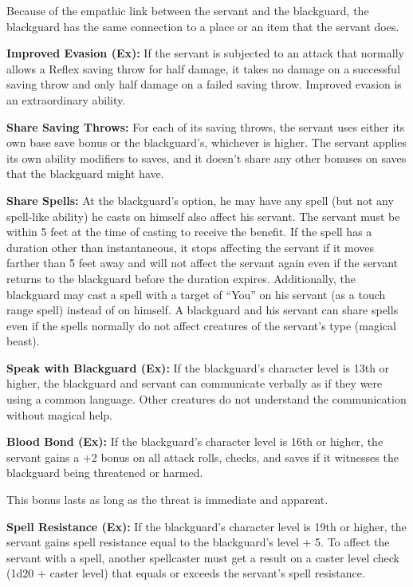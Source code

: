 \documentclass{article}
\begin{document}
Because of the empathic link between the servant and the blackguard, the blackguard 
has the same connection to a place or an item that the servant does.

\textbf{Improved Evasion (Ex):} If the servant is subjected to an attack that normally 
allows a Reflex saving throw for half damage, it takes no damage on a successful 
saving throw and only half damage on a failed saving throw. Improved evasion is 
an extraordinary ability.

\textbf{Share Saving Throws:} For each of its saving throws, the servant uses either 
its own base save bonus or the blackguard's, whichever is higher. The servant applies 
its own ability modifiers to saves, and it doesn't share any other bonuses on saves 
that the blackguard might have.

\textbf{Share Spells:} At the blackguard's option, he may have any spell (but not 
any spell-like ability) he casts on himself also affect his servant. The servant 
must be within 5 feet at the time of casting to receive the benefit. If the spell 
has a duration other than instantaneous, it stops affecting the servant if it moves 
farther than 5 feet away and will not affect the servant again even if the servant 
returns to the blackguard before the duration expires. Additionally, the blackguard 
may cast a spell with a target of ``You'' on his servant (as a touch range spell) 
instead of on himself. A blackguard and his servant can share spells even if the 
spells normally do not affect creatures of the servant's type (magical beast).

\textbf{Speak with Blackguard (Ex):} If the blackguard's character level is 13th 
or higher, the blackguard and servant can communicate verbally as if they were 
using a common language. Other creatures do not understand the communication without 
magical help.

\textbf{Blood Bond (Ex): }If the blackguard's character level is 16th or higher, 
the servant gains a +2 bonus on all attack rolls, checks, and saves if it witnesses 
the blackguard being threatened or harmed.

This bonus lasts as long as the threat is immediate and apparent.

\textbf{Spell Resistance (Ex):} If the blackguard's character level is 19th or 
higher, the servant gains spell resistance equal to the blackguard's level + 5. 
To affect the servant with a spell, another spellcaster must get a result on a 
caster level check (1d20 + caster level) that equals or exceeds the servant's spell 
resistance.
\end{document}

